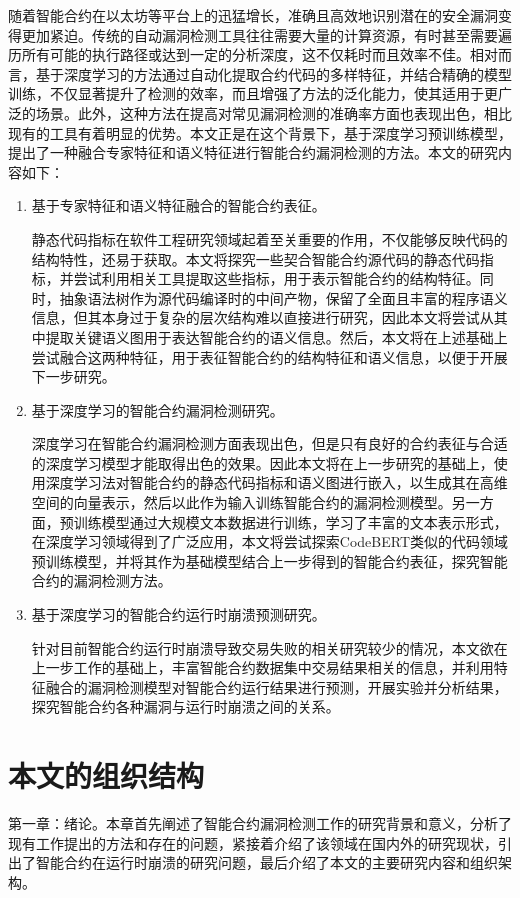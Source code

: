 随着智能合约在以太坊等平台上的迅猛增长，准确且高效地识别潜在的安全漏洞变得更加紧迫。传统的自动漏洞检测工具往往需要大量的计算资源，有时甚至需要遍历所有可能的执行路径或达到一定的分析深度，这不仅耗时而且效率不佳。相对而言，基于深度学习的方法通过自动化提取合约代码的多样特征，并结合精确的模型训练，不仅显著提升了检测的效率，而且增强了方法的泛化能力，使其适用于更广泛的场景。此外，这种方法在提高对常见漏洞检测的准确率方面也表现出色，相比现有的工具有着明显的优势。本文正是在这个背景下，基于深度学习预训练模型，提出了一种融合专家特征和语义特征进行智能合约漏洞检测的方法。本文的研究内容如下：
\begin{enumerate}[label=(\arabic*)]
    \item 基于专家特征和语义特征融合的智能合约表征。
    
    静态代码指标在软件工程研究领域起着至关重要的作用，不仅能够反映代码的结构特性，还易于获取。本文将探究一些契合智能合约源代码的静态代码指标，并尝试利用相关工具提取这些指标，用于表示智能合约的结构特征。同时，抽象语法树作为源代码编译时的中间产物，保留了全面且丰富的程序语义信息，但其本身过于复杂的层次结构难以直接进行研究，因此本文将尝试从其中提取关键语义图用于表达智能合约的语义信息。然后，本文将在上述基础上尝试融合这两种特征，用于表征智能合约的结构特征和语义信息，以便于开展下一步研究。
    \item 基于深度学习的智能合约漏洞检测研究。
    
    深度学习在智能合约漏洞检测方面表现出色，但是只有良好的合约表征与合适的深度学习模型才能取得出色的效果。因此本文将在上一步研究的基础上，使用深度学习法对智能合约的静态代码指标和语义图进行嵌入，以生成其在高维空间的向量表示，然后以此作为输入训练智能合约的漏洞检测模型。另一方面，预训练模型通过大规模文本数据进行训练，学习了丰富的文本表示形式，在深度学习领域得到了广泛应用，本文将尝试探索CodeBERT类似的代码领域预训练模型，并将其作为基础模型结合上一步得到的智能合约表征，探究智能合约的漏洞检测方法。
    \item 基于深度学习的智能合约运行时崩溃预测研究。
    
    针对目前智能合约运行时崩溃导致交易失败的相关研究较少的情况，本文欲在上一步工作的基础上，丰富智能合约数据集中交易结果相关的信息，并利用特征融合的漏洞检测模型对智能合约运行结果进行预测，开展实验并分析结果，探究智能合约各种漏洞与运行时崩溃之间的关系。
    
\end{enumerate}
\section{本文的组织结构}
\label{sec:本文的组织结构}
第一章：绪论。本章首先阐述了智能合约漏洞检测工作的研究背景和意义，分析了现有工作提出的方法和存在的问题，紧接着介绍了该领域在国内外的研究现状，引出了智能合约在运行时崩溃的研究问题，最后介绍了本文的主要研究内容和组织架构。


